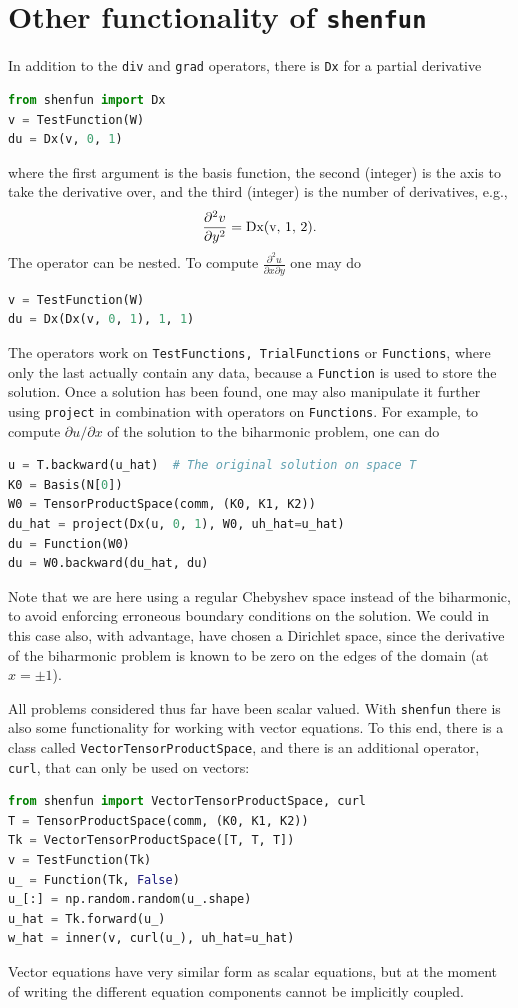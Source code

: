 \documentclass[%
oneside,                 %
final,                   %
10pt]{article}
\begin{document}
\section{Other functionality of \texttt{shenfun} }
\label{sec:extended}
In addition to the \texttt{div} and \texttt{grad} operators, there is \texttt{Dx} for a partial derivative
\begin{lstlisting}[language=Python,style=yellow2_fb]
from shenfun import Dx
v = TestFunction(W)
du = Dx(v, 0, 1)
\end{lstlisting}
where the first argument is the basis function, the second (integer) is the axis to take the derivative over, and the third (integer) is the number of derivatives, e.g.,
\begin{equation}
\frac{\partial^2 v}{\partial y^2} = \text{Dx(v, 1, 2)}. \notag
\end{equation}
The operator can be nested. To compute $\frac{\partial^2 u}{\partial x  \partial y} $ one may do
\begin{lstlisting}[language=Python,style=yellow2_fb]
v = TestFunction(W)
du = Dx(Dx(v, 0, 1), 1, 1)
\end{lstlisting}
The operators work on \texttt{TestFunctions, TrialFunctions} or \texttt{Functions}, where only the last actually contain any data, because a \texttt{Function} is used to store the solution. Once a solution has been found, one may also manipulate it further using \texttt{project} in combination with operators on \texttt{Functions}. For example, to compute $\partial u / \partial x$ of the solution to the biharmonic problem, one can do
\begin{lstlisting}[language=Python,style=yellow2_fb]
u = T.backward(u_hat)  # The original solution on space T
K0 = Basis(N[0])
W0 = TensorProductSpace(comm, (K0, K1, K2))
du_hat = project(Dx(u, 0, 1), W0, uh_hat=u_hat)
du = Function(W0)
du = W0.backward(du_hat, du)
\end{lstlisting}
Note that we are here using a regular Chebyshev space instead of the biharmonic, to avoid enforcing erroneous boundary conditions on the solution. We could in this case also, with advantage, have chosen a Dirichlet space, since the derivative of the biharmonic problem is known to be zero on the edges of the domain (at $x=\pm 1$).

All problems considered thus far have been scalar valued. With \texttt{shenfun} there is also some functionality for working with vector equations. To this end, there is a class called \texttt{VectorTensorProductSpace}, and there is an additional operator, \texttt{curl}, that can only be used on vectors:
\begin{lstlisting}[language=Python,style=yellow2_fb]
from shenfun import VectorTensorProductSpace, curl
T = TensorProductSpace(comm, (K0, K1, K2))
Tk = VectorTensorProductSpace([T, T, T])
v = TestFunction(Tk)
u_ = Function(Tk, False)
u_[:] = np.random.random(u_.shape)
u_hat = Tk.forward(u_)
w_hat = inner(v, curl(u_), uh_hat=u_hat)
\end{lstlisting}
Vector equations have very similar form as scalar equations, but at the moment of writing the different equation components cannot be implicitly coupled.
\end{document}
